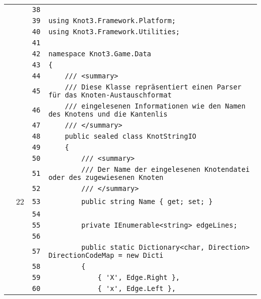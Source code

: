 \documentclass[a4paper,10pt]{article}
\begin{document}
\begin{longtable}[l]{lrrl}
\cellcolor{gray} &  & \verb~38~ & \verb~~\\
\cellcolor{gray} &  & \verb~39~ & \verb~using Knot3.Framework.Platform;~\\
\cellcolor{gray} &  & \verb~40~ & \verb~using Knot3.Framework.Utilities;~\\
\cellcolor{gray} &  & \verb~41~ & \verb~~\\
\cellcolor{gray} &  & \verb~42~ & \verb~namespace Knot3.Game.Data~\\
\cellcolor{gray} &  & \verb~43~ & \verb~{~\\
\cellcolor{gray} &  & \verb~44~ & \verb~    /// <summary>~\\
\cellcolor{gray} &  & \verb~45~ & \verb~    /// Diese Klasse repräsentiert einen Parser für das Knoten-Austauschformat~\\
\cellcolor{gray} &  & \verb~46~ & \verb~    /// eingelesenen Informationen wie den Namen des Knotens und die Kantenlis~\\
\cellcolor{gray} &  & \verb~47~ & \verb~    /// </summary>~\\
\cellcolor{gray} &  & \verb~48~ & \verb~    public sealed class KnotStringIO~\\
\cellcolor{gray} &  & \verb~49~ & \verb~    {~\\
\cellcolor{gray} &  & \verb~50~ & \verb~        /// <summary>~\\
\cellcolor{gray} &  & \verb~51~ & \verb~        /// Der Name der eingelesenen Knotendatei oder des zugewiesenen Knoten~\\
\cellcolor{gray} &  & \verb~52~ & \verb~        /// </summary>~\\
\cellcolor{green} & 22 & \verb~53~ & \verb~        public string Name { get; set; }~\\
\cellcolor{gray} &  & \verb~54~ & \verb~~\\
\cellcolor{gray} &  & \verb~55~ & \verb~        private IEnumerable<string> edgeLines;~\\
\cellcolor{gray} &  & \verb~56~ & \verb~~\\
\cellcolor{gray} &  & \verb~57~ & \verb~        public static Dictionary<char, Direction> DirectionCodeMap = new Dicti~\\
\cellcolor{gray} &  & \verb~58~ & \verb~        {~\\
\cellcolor{gray} &  & \verb~59~ & \verb~            { 'X', Edge.Right },~\\
\cellcolor{gray} &  & \verb~60~ & \verb~            { 'x', Edge.Left },~\\

\end{longtable}
\end{document}
